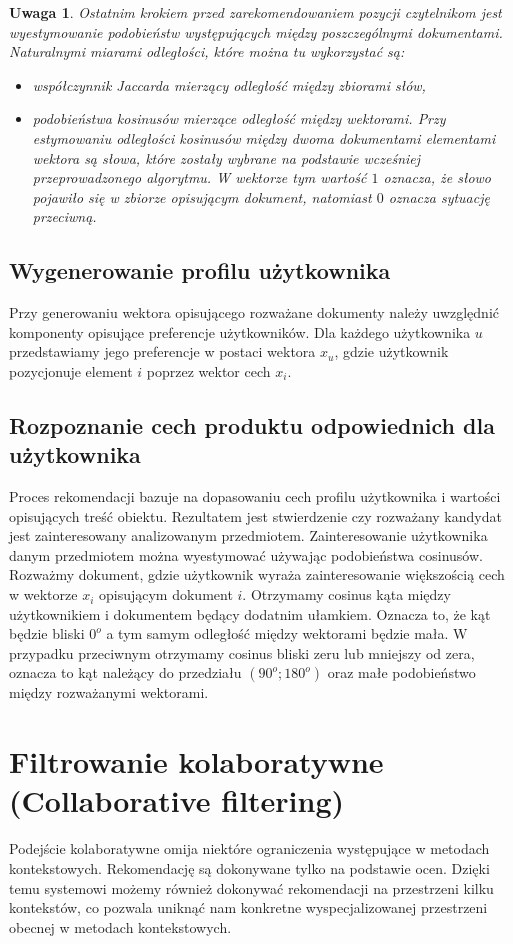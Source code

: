 \documentclass[12pt,a4paper]{report}
\newtheorem{uwaga}[df]{Uwaga}
\begin{document}
\begin{uwaga}{\citep[Sec 3.3.1.1]{rsh}}
Ostatnim krokiem przed zarekomendowaniem pozycji czytelnikom jest wyestymowanie podobieństw występujących między poszczególnymi dokumentami. Naturalnymi miarami odległości, które można tu wykorzystać są:
\begin{itemize}
\item współczynnik Jaccarda mierzący odległość między zbiorami słów,
\item podobieństwa kosinusów mierzące odległość między wektorami.
Przy estymowaniu odległości kosinusów między dwoma dokumentami elementami wektora są słowa, które zostały wybrane na podstawie wcześniej przeprowadzonego algorytmu. W wektorze tym wartość $1$ oznacza, że słowo pojawiło się w zbiorze opisującym dokument, natomiast $0$ oznacza sytuację przeciwną.
\end{itemize}
\end{uwaga}
\subsection{Wygenerowanie profilu użytkownika}
Przy generowaniu wektora opisującego rozważane dokumenty należy uwzględnić komponenty opisujące preferencje użytkowników. Dla każdego użytkownika $u$ przedstawiamy jego preferencje w postaci wektora $x_u$, gdzie użytkownik pozycjonuje element $i$ poprzez wektor cech $x_i$.
\subsection{Rozpoznanie cech produktu odpowiednich dla użytkownika} 
Proces rekomendacji bazuje na dopasowaniu cech profilu użytkownika i wartości opisujących treść obiektu. Rezultatem jest stwierdzenie czy rozważany kandydat jest zainteresowany analizowanym przedmiotem. Zainteresowanie użytkownika danym przedmiotem można wyestymować używając podobieństwa cosinusów. Rozważmy dokument, gdzie użytkownik wyraża zainteresowanie większością cech w wektorze $x_i$ opisującym dokument $i$. Otrzymamy cosinus kąta między użytkownikiem i dokumentem będący dodatnim ułamkiem. Oznacza to, że kąt będzie bliski $0^{o}$ a tym samym odległość między wektorami będzie mała. W przypadku przeciwnym otrzymamy cosinus bliski zeru lub mniejszy od zera, oznacza to kąt należący do przedziału $(90^{o};180^{o})$ oraz małe podobieństwo między rozważanymi wektorami.




\section{Filtrowanie kolaboratywne (Collaborative filtering)}
Podejście kolaboratywne omija niektóre ograniczenia występujące w metodach kontekstowych. Rekomendację są dokonywane tylko na podstawie ocen. Dzięki temu systemowi możemy również dokonywać rekomendacji na przestrzeni kilku kontekstów, co pozwala uniknąć nam konkretne wyspecjalizowanej przestrzeni obecnej w metodach kontekstowych.
\end{document}
